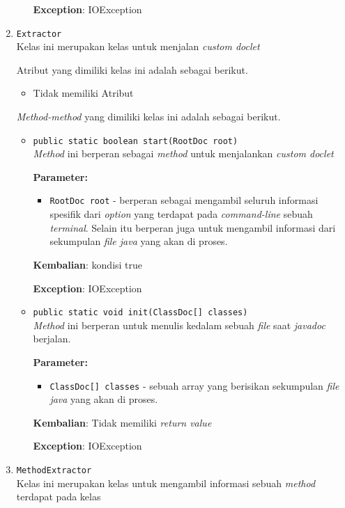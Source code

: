 \begin{enumerate}
\begin{itemize}
\textbf{Exception}: IOException

\end{itemize}
\item \texttt{Extractor}\\ 
Kelas ini merupakan kelas untuk menjalan \textit{custom doclet}

Atribut yang dimiliki kelas ini adalah sebagai berikut.
\begin{itemize}
\item Tidak memiliki Atribut
\end{itemize}
\textit{Method-method} yang dimiliki kelas ini adalah sebagai berikut.
\begin{itemize}
\item \texttt{public static boolean start(RootDoc root)}\\ 
\textit{Method} ini berperan sebagai \textit{method} untuk menjalankan \textit{custom doclet}

\textbf{Parameter:}
\begin{itemize}
\item \texttt{RootDoc root} - 
berperan sebagai mengambil seluruh informasi spesifik dari \textit{option} yang terdapat pada \textit{command-line} sebuah \textit{terminal}. Selain itu berperan juga untuk mengambil informasi dari sekumpulan \textit{file java} yang akan di proses.
\end{itemize}
\textbf{Kembalian}: kondisi true

\textbf{Exception}: IOException

\item \texttt{public static void init(ClassDoc[] classes)}\\ 
\textit{Method} ini berperan untuk menulis kedalam sebuah \textit{file} saat \textit{javadoc} berjalan.

\textbf{Parameter:}
\begin{itemize}
\item \texttt{ClassDoc[] classes} - 
sebuah array yang berisikan sekumpulan \textit{file java} yang akan di proses.
\end{itemize}
\textbf{Kembalian}: Tidak memiliki \textit{return value}

\textbf{Exception}: IOException

\end{itemize}
\item \texttt{MethodExtractor}\\ 
Kelas ini merupakan kelas untuk mengambil informasi sebuah \textit{method} terdapat pada kelas


\end{enumerate}
